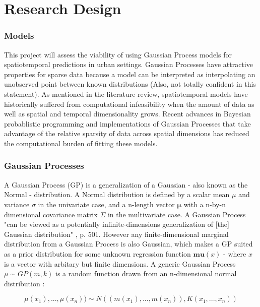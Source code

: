 
\chapter{Research Design}
\label{design}


\subsection{Models}

This project will assess the viability of using Gaussian Process models for spatiotemporal predictions in urban settings. Gaussian Processes have attractive properties for sparse data because a model can be interpreted as interpolating an unobserved point between known distributions \todo(Also, not totally confident in this statement). As mentioned in the literature review, spatiotemporal models have historically suffered from computational infeasibility when the amount of data as well as spatial and temporal dimensionality grows. Recent advances in Bayesian probablistic programming and implementations of Gaussian Processes that take advantage of the relative sparsity of data across spatial dimensions has reduced the computational burden of fitting these models. \par



\subsection{Gaussian Processes}

A Gaussian Process (GP) is a generalization of a Gaussian - also known as the Normal - distribution. A Normal distribution is defined by a scalar mean $\mu$ and variance $\sigma$ in the univariate case, and a n-length vector $\mathbf{\mu}$ with a n-by-n dimensional covariance matrix $\Sigma$ in the multivariate case. A Gaussian Process "can be viewed as a potentially infinite-dimensions generalization of [the] Gaussian distribution" \cite{gelman2013bayesian} , p. 501. However any finite-dimensional marginal distribution from a Gaussian Process is also Gaussian, which makes a GP suited as a prior distribution for some unknown regression function $\mathbf{mu}(x)$ - where $x$ is a vector with arbitary but finite dimensions. A generic Gaussian Process $\mu \sim GP(m,k)$ is a random function drawn from an n-dimensional normal distribution \cite{gelman2013bayesian}: \par

$$ \mu(x_1),...,\mu(x_n)) \sim N((m(x_1),...,m(x_n)),K(x_1,...,x_n)) $$


